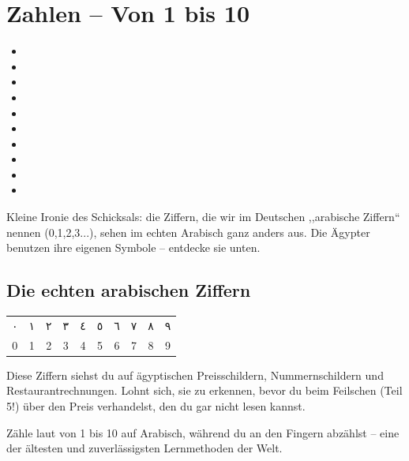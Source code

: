 
\chapter{Zahlen -- Von 1 bis 10}

\begin{itemize}[leftmargin=*]
\item {}
\item {}
\item {}
\item {}
\item {}
\item {}
\item {}
\item {}
\item {}
\item {}
\end{itemize}

\begin{lachbox}
Kleine Ironie des Schicksals: die Ziffern, die wir im Deutschen
,,arabische Ziffern`` nennen (0,1,2,3...), sehen im echten Arabisch ganz
anders aus. Die Ägypter benutzen ihre eigenen Symbole -- entdecke sie unten.
\end{lachbox}

\section*{Die echten arabischen Ziffern}

\begin{center}
\renewcommand{\arraystretch}{1.8}
\begin{tabular}{cccccccccc}
\textarabic{\Large ٠} & \textarabic{\Large ١} & \textarabic{\Large ٢} &
\textarabic{\Large ٣} & \textarabic{\Large ٤} & \textarabic{\Large ٥} &
\textarabic{\Large ٦} & \textarabic{\Large ٧} & \textarabic{\Large ٨} &
\textarabic{\Large ٩} \\
0 & 1 & 2 & 3 & 4 & 5 & 6 & 7 & 8 & 9 \\
\end{tabular}
\end{center}

\begin{tippbox}
Diese Ziffern siehst du auf ägyptischen Preisschildern, Nummernschildern
und Restaurantrechnungen. Lohnt sich, sie zu erkennen, bevor du beim
Feilschen (Teil 5!) über den Preis verhandelst, den du gar nicht lesen
kannst.
\end{tippbox}

\begin{checkpointbox}
Zähle laut von 1 bis 10 auf Arabisch, während du an den Fingern
abzählst -- eine der ältesten und zuverlässigsten Lernmethoden der Welt.
\end{checkpointbox}
